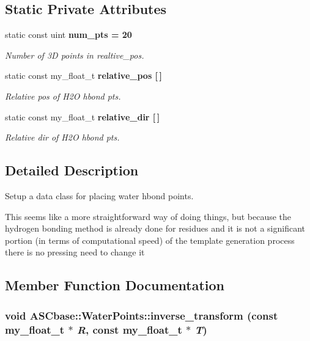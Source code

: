 \subsection*{Static Private Attributes}
\begin{CompactItemize}
\item 
static const uint \bf{num\_\-pts} = 20\label{classASCbase_1_1WaterPoints_a96d16672c2be18eb651e9594045a30d}

\begin{CompactList}\small\item\em Number of 3D points in realtive\_\-pos. \item\end{CompactList}\item 
static const my\_\-float\_\-t \bf{relative\_\-pos} [$\,$]
\begin{CompactList}\small\item\em Relative pos of H2O hbond pts. \item\end{CompactList}\item 
static const my\_\-float\_\-t \bf{relative\_\-dir} [$\,$]
\begin{CompactList}\small\item\em Relative dir of H2O hbond pts. \item\end{CompactList}\end{CompactItemize}


\subsection{Detailed Description}
Setup a data class for placing water hbond points. 

This seems like a more straightforward way of doing things, but because the hydrogen bonding method is already done for residues and it is not a significant portion (in terms of computational speed) of the template generation process there is no pressing need to change it 



\subsection{Member Function Documentation}
\subsubsection{\setlength{\rightskip}{0pt plus 5cm}void ASCbase::Water\-Points::inverse\_\-transform (const my\_\-float\_\-t $\ast$ {\em R}, const my\_\-float\_\-t $\ast$ {\em T})\hspace{0.3cm}{\tt  [inline]}}\label{classASCbase_1_1WaterPoints_af926b1ccfc8db7ae215209d006e338b}


